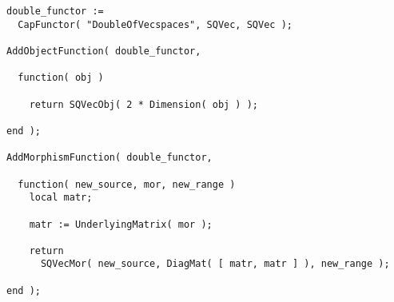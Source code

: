 \begin{small}
\begin{Verbatim}[frame=single]
double_functor :=
  CapFunctor( "DoubleOfVecspaces", SQVec, SQVec );

AddObjectFunction( double_functor,
                   
  function( obj )
    
    return SQVecObj( 2 * Dimension( obj ) );
    
end );

AddMorphismFunction( double_functor,
                     
  function( new_source, mor, new_range )
    local matr;
    
    matr := UnderlyingMatrix( mor );
    
    return
      SQVecMor( new_source, DiagMat( [ matr, matr ] ), new_range );
    
end );
\end{Verbatim}
\end{small}